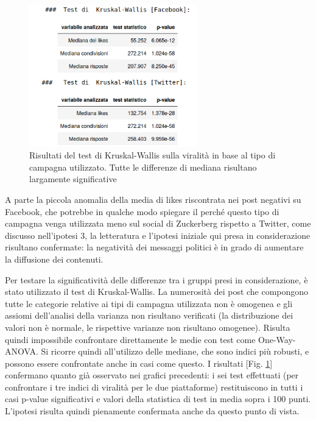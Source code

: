 \begin{figure}
	\centering
	\includegraphics[width=0.65\textwidth]{figures/testmediane}
	\caption{Risultati del test di Kruskal-Wallis sulla viralità in base al tipo di campagna utilizzato. Tutte le differenze di mediana risultano largamente significative}
	\label{fig:testmediane}
\end{figure}
A parte la piccola anomalia della media di likes riscontrata nei post negativi su Facebook, che potrebbe in qualche modo spiegare il perché questo tipo di campagna venga utilizzata meno sul social di Zuckerberg rispetto a Twitter, come discusso nell'ipotesi 3, la letteratura e l'ipotesi iniziale qui presa in considerazione risultano confermate: la negatività dei messaggi politici è in grado di aumentare la diffusione dei contenuti.

Per testare la significatività delle differenze tra i gruppi presi in considerazione, è stato utilizzato il test di Kruskal-Wallis. La numerosità dei post che compongono tutte le categorie relative ai tipi di campagna utilizzata non è omogenea e gli assiomi dell'analisi della varianza non risultano verificati (la distribuzione dei valori non è normale, le rispettive varianze non risultano omogenee). Risulta quindi impossibile confrontare direttamente le medie con test come One-Way-ANOVA. Si ricorre quindi all'utilizzo delle mediane, che sono indici più robusti, e possono essere confrontate anche in casi come questo.
I risultati [Fig. \ref{fig:testmediane}] confermano quanto già osservato nei grafici precedenti: i sei test effettuati (per confrontare i tre indici di viralità per le due piattaforme) restituiscono in tutti i casi p-value significativi e valori della statistica di test in media sopra i 100 punti. L'ipotesi risulta quindi pienamente confermata anche da questo punto di vista.


